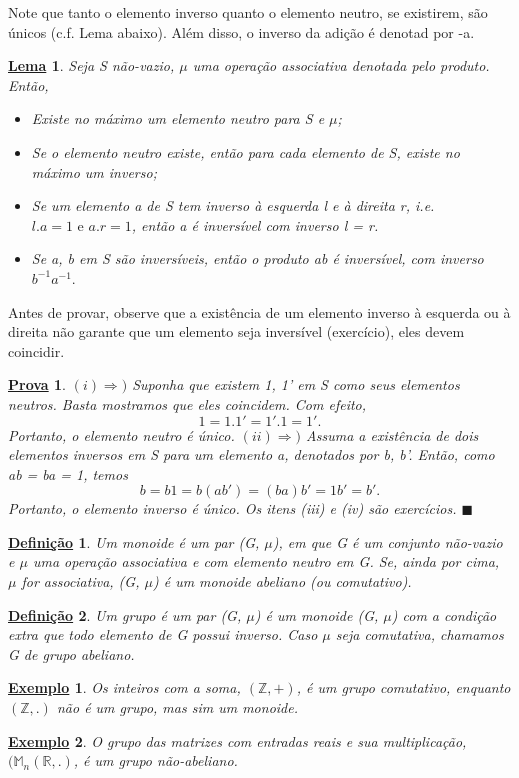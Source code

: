 \documentclass{article}
\newtheorem*{def*}{\underline{Defini\c c\~ao}}
\newtheorem{example*}{\underline{Exemplo}}
\newtheorem*{proof*}{\underline{Prova}}
\newtheorem*{lemma*}{\underline{Lema}}
\renewcommand\qedsymbol{$\blacksquare$}
\begin{document}
  Note que tanto o elemento inverso quanto o elemento neutro, se existirem, s\~ao \'unicos (c.f. Lema abaixo). Al\'em disso, o inverso da adi\c c\~ao \'e
denotad por -a.
\begin{lemma*}
  Seja S n\~ao-vazio, $\mu$ uma opera\c c\~ao associativa denotada pelo produto. Ent\~ao, 
 \begin{itemize}
   \item[i)] Existe no m\'aximo um elemento neutro para S e $\mu$;
   \item[ii)] Se o elemento neutro existe, ent\~ao para cada elemento de S, existe no m\'aximo um inverso;
   \item[iii)] Se um elemento a de S tem inverso \`a esquerda l e \`a direita r, i.e. $l.a = 1 \text{ e } a.r = 1$, ent\~ao
a \'e invers\'ivel com inverso l = r.
   \item[iv)] Se a, b em S s\~ao invers\'iveis, ent\~ao o produto ab \'e invers\'ivel, com inverso $b^{-1}a^{-1}.$
 \end{itemize}
\end{lemma*}
  Antes de provar, observe que a exist\^encia de um elemento inverso \`a esquerda ou \`a direita n\~ao garante que um elemento
seja invers\'ivel (exerc\'icio), eles devem coincidir.
\begin{proof*}
 $(i)\Rightarrow)$ Suponha que existem 1, 1' em S como seus elementos neutros. Basta mostramos que eles coincidem. Com efeito,
 $$
    1 = 1.1' = 1'.1 = 1'.
 $$
 Portanto, o elemento neutro \'e \'unico.
 $(ii)\Rightarrow)$ Assuma a exist\^encia de dois elementos inversos em S para um elemento a, denotados por b, b'. Ent\~ao, como
ab = ba = 1, temos
  $$
    b = b1 = b(ab') = (ba)b' = 1b' = b'.
  $$
  Portanto, o elemento inverso \'e \'unico. Os itens (iii) e (iv) s\~ao exerc\'icios. \qedsymbol
\end{proof*}
  
 \begin{def*}
   Um monoide \'e um par (G, $\mu$), em que G \'e um conjunto n\~ao-vazio e $\mu$ uma opera\c c\~ao associativa e com elemento neutro em G.
  Se, ainda por cima, $\mu$ for associativa, (G, $\mu$) \' e um monoide abeliano (ou comutativo).
 \end{def*}
 \begin{def*}
   Um grupo \'e um par (G, $\mu$) \'e um monoide (G, $\mu$) com a condi\c c\~ao extra que todo elemento de G possui inverso. Caso
 $\mu$ seja comutativa, chamamos G de grupo abeliano.
 \end{def*}
\begin{example*}
  Os inteiros com a soma, $(\mathbb{Z}, +)$, \'e um grupo comutativo, enquanto $(\mathbb{Z}, .)$ n\~ao \'e um grupo, mas sim um monoide.
\end{example*}
\begin{example*}
  O grupo das matrizes com entradas reais e sua multiplica\c c\~ao, $(\mathbb{M}_{n}(\mathbb{R}, .)$, \'e um grupo n\~ao-abeliano.
\end{example*}
 
\end{document}
